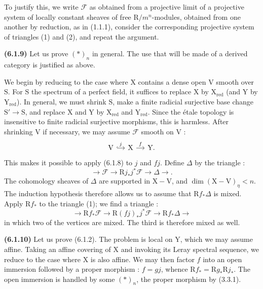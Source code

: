 \documentclass[11pt,leqno]{article}
\begin{document}
To justify this, we write \(\mathscr{F}\) as obtained from a
projective limit of a projective system of locally constant sheaves
of free \(\mathrm{R}/m^n\)-modules, obtained from one another
by reduction, as in (1.1.1), consider the
corresponding projective system of triangles (1) and (2), and
repeat the argument.

\textbf{(6.1.9)} Let us prove \((*)_n\) in general. The use that will be made
of a derived category is justified as above.

We begin by reducing to the case where \(\mathrm{X}\) contains
a dense open \(\mathrm{V}\) smooth over \(\mathrm{S}\). For
\(\mathrm{S}\) the spectrum of a perfect field, it suffices to replace
\(\mathrm{X}\) by \(\mathrm{X}_{\mathrm{red}}\) (and \(\mathrm{Y}\)
by \(\mathrm{Y}_{\mathrm{red}}\)). In general, we must shrink
\(\mathrm{S}\), make a finite radicial surjective base change
\(\mathrm{S}'\to\mathrm{S}\), and replace \(\mathrm{X}\)
and \(\mathrm{Y}\) by \(\mathrm{X}_{\mathrm{red}}\) and
\(\mathrm{Y}_{\mathrm{red}}\). Since the étale topology is insensitive
to finite radicial surjective morphisms, this is harmless.
After shrinking \(\mathrm{V}\) if necessary, we may assume \(\mathscr{F}\)
smooth on \(\mathrm{V}\) :
\[
\begin{tikzcd}[column sep=small]
\mathrm{V} \arrow[r,hook,"j"] &
\mathrm{X} \arrow[r,"f"] &
\mathrm{Y}.
\end{tikzcd}
\]
This makes it possible to apply (6.1.8) to \(j\) and \(fj\). Define
\(\Delta\) by the triangle :
\[
\tag*{(1)}
\to\mathscr{F}\to\mathrm{R}j_*j^*\mathscr{F}\to\Delta\to.
\]
The cohomology sheaves of \(\Delta\) are supported in
\(\mathrm{X}-\mathrm{V}\), and
\(\dim(\mathrm{X}-\mathrm{V})_\eta<n\). The induction hypothesis
therefore allows us to assume that \(\mathrm{R}f_*\Delta\) is mixed.
Apply \(\mathrm{R}f_*\) to the triangle (1); we find a triangle :
\[
\to\mathrm{R}f_*\mathscr{F}
\to\mathrm{R}(fj)_*j^*\mathscr{F}
\to\mathrm{R}f_*\Delta\to
\]
in which two of the vertices are mixed. The third is therefore
mixed as well.

\textbf{(6.1.10)} Let us prove (6.1.2). The problem is local on
\(\mathrm{Y}\), which we may assume affine. Taking an affine
covering of \(\mathrm{X}\) and invoking its Leray spectral sequence,
we reduce to the case where \(\mathrm{X}\) is also affine. We may then
factor \(f\) into an open immersion followed by a proper morphism :
\(f=gj\), whence \(\mathrm{R}f_*=\mathrm{R}g_*\mathrm{R}j_*\).
The open immersion is handled by some \((*)_n\), the proper
morphism by (3.3.1).
\end{document}
